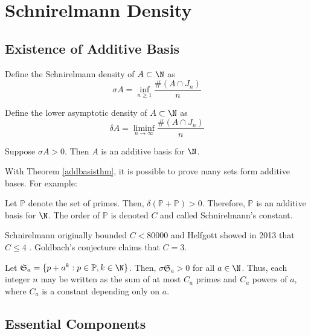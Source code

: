 \section{Schnirelmann Density}

\subsection{Existence of Additive Basis}

\begin{definition}
    Define the Schnirelmann density of $A\subset \N$ as
    $$\sigma A=\inf_{n\ge1}\frac{\#(A\cap J_n)}{n}$$
\end{definition}

\begin{definition}
    Define the lower asymptotic density of $A\subset \N$ as
    $$\delta A=\liminf_{n\to\infty}\frac{\#(A\cap J_n)}{n}$$
\end{definition}

\begin{theorem}
    Suppose $\sigma A>0$. Then $A$ is an additive basis for $\N$. \label{addbasisthm}
\end{theorem}

With Theorem \ref{addbasisthm}, it is possible to prove many sets form additive bases. For example:

\begin{theorem}
    Let $\mathbb P$ denote the set of primes. Then, $\delta(\mathbb P+\mathbb P)>0$. Therefore, $\mathbb P$ is an additive basis for $\N$. The order of $\mathbb P$ is denoted $C$ and called Schnirelmann's constant.
\end{theorem}

Schnirelmann originally bounded $C<80000$ and Helfgott showed in 2013 that $C\le4$ \cite{helfgott2015ternarygoldbachproblem}. Goldbach's conjecture claims that $C=3$.

\begin{theorem}
    Let $\mathfrak S_a=\{p+a^k:p\in\mathbb P, k\in\N\}$. Then, $\sigma\mathfrak S_a>0$ for all $a\in\N$. Thus, each integer $n$ may be written as the sum of at most $C_a$ primes and $C_a$ powers of $a$, where $C_a$ is a constant depending only on $a$.
\end{theorem}


\subsection{Essential Components}

